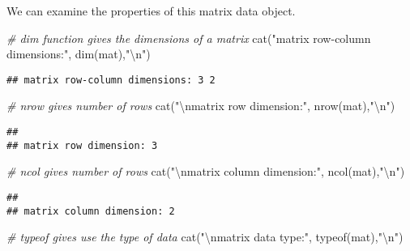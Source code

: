 \documentclass[
]{article}
\newenvironment{Shaded}{\begin{snugshade}}{\end{snugshade}}
\newcommand{\CommentTok}[1]{\textcolor[rgb]{0.56,0.35,0.01}{\textit{#1}}}
\newcommand{\FunctionTok}[1]{\textcolor[rgb]{0.00,0.00,0.00}{#1}}
\newcommand{\NormalTok}[1]{#1}
\newcommand{\SpecialCharTok}[1]{\textcolor[rgb]{0.00,0.00,0.00}{#1}}
\newcommand{\StringTok}[1]{\textcolor[rgb]{0.31,0.60,0.02}{#1}}
\begin{document}
We can examine the properties of this matrix data object.

\begin{Shaded}
\begin{Highlighting}[]
\CommentTok{\# dim function gives the dimensions of a matrix}
\FunctionTok{cat}\NormalTok{(}\StringTok{"matrix row{-}column dimensions:"}\NormalTok{, }\FunctionTok{dim}\NormalTok{(mat),}\StringTok{"}\SpecialCharTok{\textbackslash{}n}\StringTok{"}\NormalTok{)}
\end{Highlighting}
\end{Shaded}

\begin{verbatim}
## matrix row-column dimensions: 3 2
\end{verbatim}

\begin{Shaded}
\begin{Highlighting}[]
\CommentTok{\# nrow gives number of rows}
\FunctionTok{cat}\NormalTok{(}\StringTok{"}\SpecialCharTok{\textbackslash{}n}\StringTok{matrix row dimension:"}\NormalTok{, }\FunctionTok{nrow}\NormalTok{(mat),}\StringTok{"}\SpecialCharTok{\textbackslash{}n}\StringTok{"}\NormalTok{)}
\end{Highlighting}
\end{Shaded}

\begin{verbatim}
## 
## matrix row dimension: 3
\end{verbatim}

\begin{Shaded}
\begin{Highlighting}[]
\CommentTok{\# ncol gives number of rows}
\FunctionTok{cat}\NormalTok{(}\StringTok{"}\SpecialCharTok{\textbackslash{}n}\StringTok{matrix column dimension:"}\NormalTok{, }\FunctionTok{ncol}\NormalTok{(mat),}\StringTok{"}\SpecialCharTok{\textbackslash{}n}\StringTok{"}\NormalTok{)}
\end{Highlighting}
\end{Shaded}

\begin{verbatim}
## 
## matrix column dimension: 2
\end{verbatim}

\begin{Shaded}
\begin{Highlighting}[]
\CommentTok{\# typeof gives use the type of data}
\FunctionTok{cat}\NormalTok{(}\StringTok{"}\SpecialCharTok{\textbackslash{}n}\StringTok{matrix data type:"}\NormalTok{, }\FunctionTok{typeof}\NormalTok{(mat),}\StringTok{"}\SpecialCharTok{\textbackslash{}n}\StringTok{"}\NormalTok{)}
\end{Highlighting}
\end{Shaded}
\end{document}
